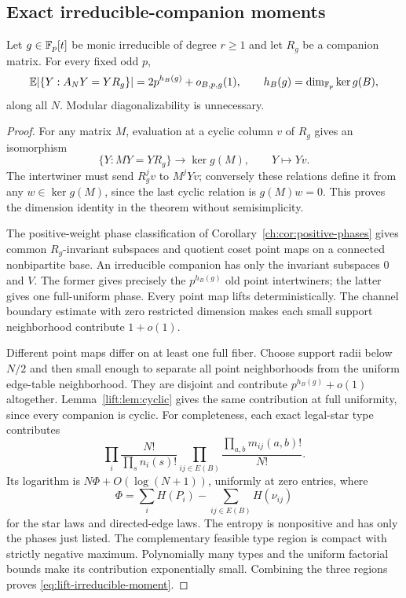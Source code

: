 \subsection{Exact irreducible-companion moments}
\begin{theorem}\label{lift:thm:irreducible-moment}
Let $g\in\mathbb F_p[t]$ be monic irreducible of degree $r\ge1$ and let
$R_g$ be a companion matrix. For every fixed odd $p$,
\begin{equation}\label{eq:lift-irreducible-moment}
 \mathbb E|\{Y:A_NY=YR_g\}|=2p^{h_B(g)}+o_{B,p,g}(1),\qquad
 h_B(g)=\dim_{\mathbb F_p}\ker g(B),
\end{equation}
along all $N$. Modular diagonalizability is unnecessary.
\end{theorem}
\begin{proof}
For any matrix $M$, evaluation at a cyclic column $v$ of $R_g$
gives an isomorphism
\begin{equation}\label{eq:lift-hom-kernel}
 \{Y:MY=YR_g\}\longrightarrow\ker g(M),\qquad Y\mapsto Yv.
\end{equation}
The intertwiner must send $R_g^jv$ to $M^jYv$; conversely these
relations define it from any $w\in\ker g(M)$, since the last cyclic
relation is $g(M)w=0$. This proves the dimension identity in the
theorem without semisimplicity.

The positive-weight phase classification of
Corollary~\ref{ch:cor:positive-phases} gives common $R_g$-invariant
subspaces and quotient coset point maps on a connected nonbipartite
base. An irreducible companion has only the invariant subspaces
$0$ and $V$. The former gives precisely the $p^{h_B(g)}$ old
point intertwiners; the latter gives one full-uniform phase.
Every point map lifts deterministically. The channel boundary estimate
with zero restricted dimension makes each small support neighborhood
contribute $1+o(1)$.

Different point maps differ on at least one full fiber. Choose
support radii below $N/2$ and then small enough to separate all
point neighborhoods from the uniform edge-table neighborhood.
They are disjoint and contribute $p^{h_B(g)}+o(1)$ altogether.
Lemma~\ref{lift:lem:cyclic} gives the same contribution at full
uniformity, since every companion is cyclic.
For completeness, each exact legal-star type contributes
\[
 \prod_i\frac{N!}{\prod_s n_i(s)!}
 \prod_{ij\in E(B)}\frac{\prod_{a,b}m_{ij}(a,b)!}{N!}.
\]
Its logarithm is $N\Phi+O(\log(N+1))$, uniformly at zero entries,
where
\[
 \Phi=\sum_iH(P_i)-\sum_{ij\in E(B)}H(\nu_{ij})
\]
for the star laws and directed-edge laws.
The entropy is nonpositive and has only the phases just listed.
The complementary feasible type region is compact with strictly
negative maximum. Polynomially many types and the uniform factorial
bounds make its contribution exponentially small. Combining the
three regions proves \eqref{eq:lift-irreducible-moment}.
\end{proof}


